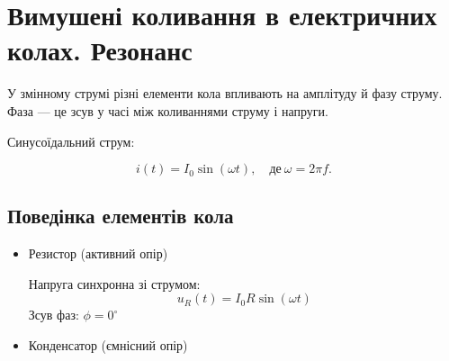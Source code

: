 \section{Вимушені коливання в електричних колах. Резонанс}

\begin{Theory}

	У змінному струмі різні елементи кола впливають на амплітуду й фазу струму. Фаза --- це зсув у часі між коливаннями струму і напруги.

	Синусоїдальний струм:

	\begin{equation*}
		i(t) = I_0 \sin(\omega t),\quad \text{де}\ \omega = 2\pi f.
	\end{equation*}

	\subsection*{Поведінка елементів кола}

	\begin{itemize}

		\item Резистор (активний опір)

		      \begin{center}
		      \end{center}

		      Напруга синхронна зі струмом:
		      \begin{equation}
			      u_R(t) = I_0 R \sin(\omega t)
		      \end{equation}
		      Зсув фаз: $\phi = 0^\circ$

		\item Конденсатор (ємнісний опір)

		      \begin{center}
		      \end{center}


\end{itemize}
\end{Theory}
